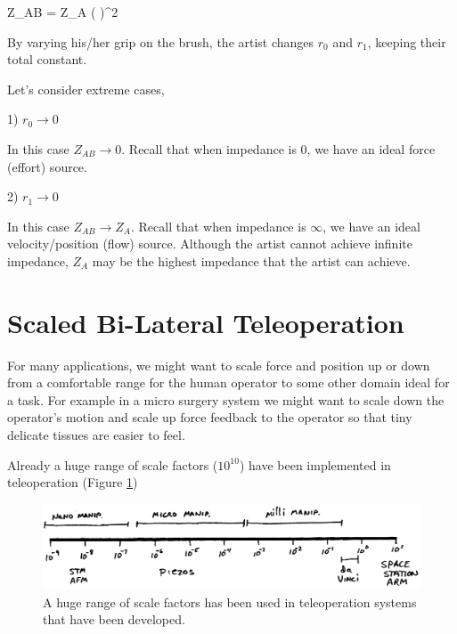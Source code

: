 \bq
Z_{AB} = Z_A \left(  \right)^2
\eq

By varying his/her grip on the brush, the artist changes $r_0$ and $r_1$, keeping their total constant.

Let's consider extreme cases,

1)  $r_0 \rightarrow 0$

In this case $Z_{AB} \rightarrow 0$.    Recall that when impedance is 0, we have an ideal force (effort) source.


2)  $r_1 \rightarrow 0$

In this case $Z_{AB} \rightarrow Z_A$.     Recall that when impedance is $\infty$, we have an ideal velocity/position (flow) source.  Although the artist cannot achieve infinite impedance, $Z_A$ may be the highest impedance that the artist can achieve.



\section{Scaled Bi-Lateral Teleoperation}

For many applications, we might want to scale force and position up or down from a comfortable range for the human operator to some other domain ideal for a task.  For example in a micro surgery system we might want to scale down the operator's motion and scale up force feedback to the operator so that tiny delicate tissues are easier to feel.	%

Already a huge range of scale factors ($10^{10}$) have been implemented in teleoperation (Figure \ref{ScaleRange})

\begin{figure}[h]	%
\centering \includegraphics[width=4.5in]{figs14/00317.eps}
\caption{A huge range of scale factors has been used in teleoperation systems that have been developed.}\label{ScaleRange}	%
\end{figure}	%

